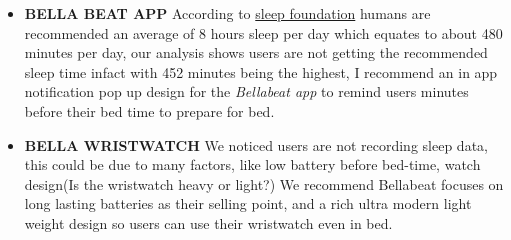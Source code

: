 \documentclass[
]{article}
\providecommand{\tightlist}{%
  \setlength{\itemsep}{0pt}\setlength{\parskip}{0pt}}
\begin{document}
\begin{itemize}
\tightlist
\item
  \textbf{BELLA BEAT APP} According to
  \href{https://www.sleepfoundation.org/how-sleep-works/how-much-sleep-do-we-really-need\#:~:text=National\%20Sleep\%20Foundation\%20guidelines1,to\%208\%20hours\%20per\%20night.}{sleep
  foundation} humans are recommended an average of 8 hours sleep per day
  which equates to about 480 minutes per day, our analysis shows users
  are not getting the recommended sleep time infact with 452 minutes
  being the highest, I recommend an in app notification pop up design
  for the \emph{Bellabeat app} to remind users minutes before their bed
  time to prepare for bed.
\item
  \textbf{BELLA WRISTWATCH} We noticed users are not recording sleep
  data, this could be due to many factors, like low battery before
  bed-time, watch design(Is the wristwatch heavy or light?) We recommend
  Bellabeat focuses on long lasting batteries as their selling point,
  and a rich ultra modern light weight design so users can use their
  wristwatch even in bed.
\end{itemize}
\end{document}
